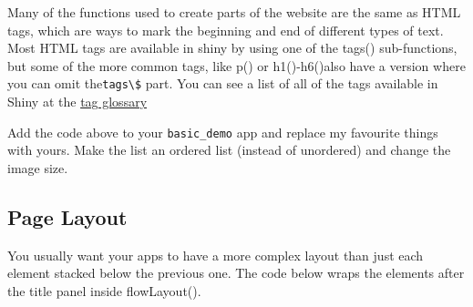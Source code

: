\documentclass[
]{book}
\newenvironment{Shaded}{\begin{snugshade}}{\end{snugshade}}
\newcommand{\AttributeTok}[1]{\textcolor[rgb]{0.77,0.63,0.00}{#1}}
\newcommand{\FunctionTok}[1]{\textcolor[rgb]{0.00,0.00,0.00}{#1}}
\newcommand{\NormalTok}[1]{#1}
\newcommand{\OtherTok}[1]{\textcolor[rgb]{0.56,0.35,0.01}{#1}}
\newcommand{\SpecialCharTok}[1]{\textcolor[rgb]{0.00,0.00,0.00}{#1}}
\newcommand{\StringTok}[1]{\textcolor[rgb]{0.31,0.60,0.02}{#1}}
\begin{document}
Many of the functions used to create parts of the website are the same as HTML tags, which are ways to mark the beginning and end of different types of text. Most HTML tags are available in shiny by using one of the tags() sub-functions, but some of the more common tags, like p() or h1()-h6()also have a version where you can omit the\texttt{tags\textbackslash{}\$} part. You can see a list of all of the tags available in Shiny at the \href{https://shiny.rstudio.com/articles/tag-glossary.html}{tag glossary}

Add the code above to your \texttt{basic\_demo} app and replace my favourite things with yours. Make the list an ordered list (instead of unordered) and change the image size.

\hypertarget{page-layout}{%
\subsection{Page Layout}\label{page-layout}}

You usually want your apps to have a more complex layout than just each element stacked below the previous one. The code below wraps the elements after the title panel inside flowLayout().

\begin{Shaded}
\end{Shaded}
\end{document}
